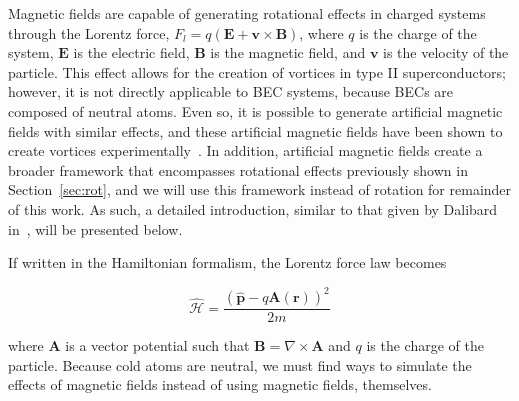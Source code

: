Magnetic fields are capable of generating rotational effects in charged systems through the Lorentz force, $F_l = q(\mathbf{E} + \mathbf{v} \times \mathbf{B})$, where $q$ is the charge of the system, $\mathbf{E}$ is the electric field, $\mathbf{B}$ is the magnetic field, and $\mathbf{v}$ is the velocity of the particle.
This effect allows for the creation of vortices in type II superconductors; however, it is not directly applicable to BEC systems, because BECs are composed of neutral atoms.
Even so, it is possible to generate artificial magnetic fields with similar effects, and these artificial magnetic fields have  been shown to create vortices experimentally~\cite{lin2009}.
In addition, artificial magnetic fields create a broader framework that encompasses rotational effects previously shown in Section~\ref{sec:rot}, and we will use this framework instead of rotation for remainder of this work.
As such, a detailed introduction, similar to that given by Dalibard in~\cite{dalibard2015}, will be presented below.

If written in the Hamiltonian formalism, the Lorentz force law becomes

\begin{equation}
\mathcal{\hat{H}} = \frac{(\mathbf{\hat p} - q\mathbf{A}(\mathbf{r}))^2}{2m}
\end{equation}

\noindent where $\mathbf{A}$ is a vector potential such that $\mathbf{B} = \nabla \times \mathbf{A}$ and $q$ is the charge of the particle.
Because cold atoms are neutral, we must find ways to simulate the effects of magnetic fields instead of using magnetic fields, themselves.

